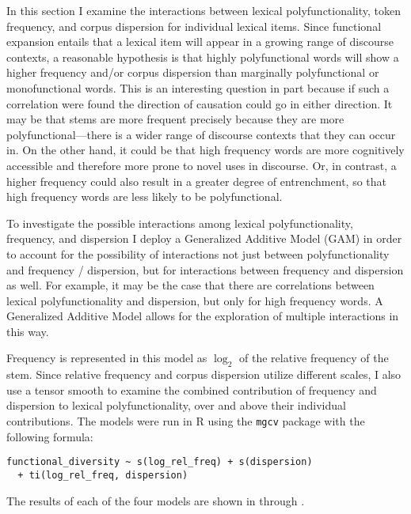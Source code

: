 In this section I examine the interactions between lexical polyfunctionality, token frequency, and corpus dispersion for individual lexical items. Since functional expansion entails that a lexical item will appear in a growing range of discourse contexts, a reasonable hypothesis is that highly polyfunctional words will show a higher frequency and/or corpus dispersion than marginally polyfunctional or monofunctional words. This is an interesting question in part because if such a correlation were found the direction of causation could go in either direction. It may be that stems are more frequent precisely because they are more polyfunctional—there is a wider range of discourse contexts that they can occur in. On the other hand, it could be that high frequency words are more cognitively accessible and therefore more prone to novel uses in discourse. Or, in contrast, a higher frequency could also result in a greater degree of entrenchment, so that high frequency words are less likely to be polyfunctional.

To investigate the possible interactions among lexical polyfunctionality, frequency, and dispersion I deploy a Generalized Additive Model (GAM) in order to account for the possibility of interactions not just between polyfunctionality and frequency / dispersion, but for interactions between frequency and dispersion as well. For example, it may be the case that there are correlations between lexical polyfunctionality and dispersion, but only for high frequency words. A Generalized Additive Model allows for the exploration of multiple interactions in this way.

Frequency is represented in this model as $\log_2$ of the relative frequency of the stem. Since relative frequency and corpus dispersion utilize different scales, I also use a tensor smooth to examine the combined contribution of frequency and dispersion to lexical polyfunctionality, over and above their individual contributions. The models were run in R using the \texttt{mgcv} package with the following formula:

\begin{verbatim}
functional_diversity ~ s(log_rel_freq) + s(dispersion)
  + ti(log_rel_freq, dispersion)
\end{verbatim}

The results of each of the four models are shown in  through .

